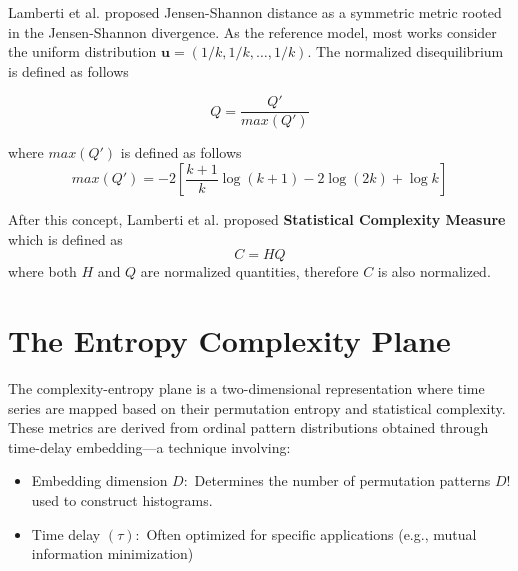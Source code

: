 Lamberti et al. \cite{lamberti2004intensive} proposed Jensen-Shannon distance as a symmetric metric rooted in the Jensen-Shannon divergence. As the reference model, most works consider the uniform distribution $\mathbf{u}=(1/k,1/k, \dots, 1/k)$. The normalized disequilibrium is defined as follows

\begin{equation}
	Q=\dfrac{Q'}{max{(Q')}}
\end{equation}

where $max(Q')$ is defined as follows
\begin{equation}
	max(Q')=-2 \left[\dfrac{k+1}{k}\log(k+1)-2\log(2k)+\log k\right]
\end{equation}

After this concept, Lamberti et al. \cite{lamberti2004intensive} proposed \textbf{Statistical Complexity Measure} which is defined as 
\begin{equation}
	C=HQ
\end{equation}
where both $H$ and $Q$ are normalized quantities, therefore $C$ is also normalized. 
  
\section{The Entropy Complexity Plane}
The complexity-entropy plane is a two-dimensional representation where time series are mapped based on their permutation entropy and statistical complexity. These metrics are derived from ordinal pattern distributions obtained through time-delay embedding—a technique involving:
\begin{itemize}
	\item Embedding dimension $D:$ Determines the number of permutation patterns $D!$ used to construct histograms.
	\item Time delay $(\tau):$ Often optimized for specific applications (e.g., mutual information minimization)  
\end{itemize} 

